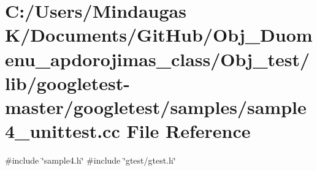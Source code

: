 \hypertarget{_obj__test_2lib_2googletest-master_2googletest_2samples_2sample4__unittest_8cc}{}\section{C\+:/\+Users/\+Mindaugas K/\+Documents/\+Git\+Hub/\+Obj\+\_\+\+Duomenu\+\_\+apdorojimas\+\_\+class/\+Obj\+\_\+test/lib/googletest-\/master/googletest/samples/sample4\+\_\+unittest.cc File Reference}
\label{_obj__test_2lib_2googletest-master_2googletest_2samples_2sample4__unittest_8cc}
{\ttfamily \#include \char`\"{}sample4.\+h\char`\"{}}\newline
{\ttfamily \#include \char`\"{}gtest/gtest.\+h\char`\"{}}\newline
